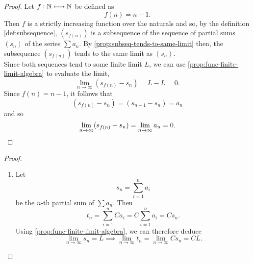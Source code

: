 \documentclass[../MathsNotesBase.tex]{subfiles}
\begin{document}
{		\biggerskip
		\begin{proof}
			Let ${ f: \mathbb{N}^{}\longmapsto \mathbb{N}^{} }$ be defined as
			\[ f(n) = n-1. \]
			Then $f$ is a strictly increasing function over the naturals and so, by the definition \ref{def:subsequence}, $(s_{f(n)})$ is a subsequence of the sequence of partial sums $(s_n)$ of the series $\sum a_n$. By \autoref{prop:subseq-tends-to-same-limit} then, the subsequence $(s_{f(n)})$ tends to the same limit as $(s_n)$.\\
			Since both sequences tend to some finite limit $L$, we can use \autoref{prop:func-finite-limit-algebra} to evaluate the limit,
			\[ \lim_{n \to \infty} (s_{f(n)} - s_n) = L - L = 0. \]
			Since ${ f(n) = n-1 }$, it follows that
			\[ (s_{f(n)} - s_n) = (s_{n-1} - s_n) = a_n \]
			and so
			\[ \lim_{n \to \infty} (s_{f(n)} - s_n) = \lim_{n \to \infty} a_n = 0.  \qedhere \]
		\end{proof}
	
	
		\bigskip
		\begin{proof}\nl
			\begin{enumerate}[label=(\roman*)]
				\item Let
					\[ s_n = \sum_{i=1}^n a_i \]
					be the $n$-th partial sum of ${ \sum a_n }$. Then
					\[ t_n = \sum_{i=1}^n C a_i = C \sum_{i=1}^n a_i = C s_n. \]
					Using \autoref{prop:func-finite-limit-algebra}, we can therefore deduce
					\[ \lim_{n \to \infty} s_n = L \implies \lim_{n \to \infty} t_n = \lim_{n \to \infty} C s_n = C L.  \]
				

\end{enumerate}
\end{proof}}
\end{document}
